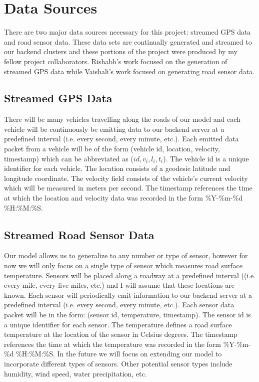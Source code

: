 \documentclass{vldb}
\begin{document}
\section{Data Sources}
There are two major data sources necessary for this project: streamed GPS data and road sensor data. These data sets are continually generated and streamed to our backend clusters and these portions of the project were produced by my fellow project collaborators. Rishabh’s work focused on the generation of streamed GPS data while Vaishali’s work focused on generating road sensor data. 

\subsection{Streamed GPS Data}
There will be many vehicles travelling along the roads of our model and each vehicle will be continuously be emitting data to our backend server at a predefined interval (i.e. every second, every minute, etc.). Each emitted data packet from a vehicle will be of the form (vehicle id, location, velocity, timestamp) which can be abbreviated as ($id, v_i, l_i, t_i$). The vehicle id is a unique identifier for each vehicle. The location consists of a geodesic latitude and longitude coordinate. The velocity field consists of the vehicle’s current velocity which will be measured in meters per second. The timestamp references the time at which the location and velocity data was recorded in the form \%Y-\%m-\%d \%H:\%M:\%S.

\subsection{Streamed Road Sensor Data}
Our model allows us to generalize to any number or type of sensor, however for now we will only focus on a single type of sensor which measures road surface temperature. Sensors will be placed along a roadway at a predefined interval ((i.e. every mile, every five miles, etc.) and I will assume that these locations are known. Each sensor will periodically emit information to our backend server at a predefined interval (i.e. every second, every minute, etc.). Each sensor data packet will be in the form: (sensor id, temperature, timestamp). The sensor id is a unique identifier for each sensor. The temperature defines a road surface temperature at the location of the sensor in Celsius degrees. The timestamp references the time at which the temperature was recorded in the form \%Y-\%m-\%d \%H:\%M:\%S. In the future we will focus on extending our model to incorporate different types of sensors. Other potential sensor types include humidity, wind speed, water precipitation, etc. 
\end{document}
